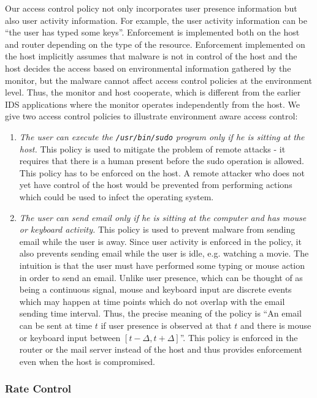 Our access control policy not only incorporates user presence information
but also user activity information.
For example, the user activity information can be 
``the user has typed some keys''.
Enforcement is implemented both on the host and
router depending on the type of the resource. Enforcement implemented on
the host implicitly assumes that malware is not in control of the
host and the host decides the access based on environmental
information gathered by the monitor, but the malware cannot affect
access control policies at the environment level.
Thus, the monitor and host cooperate, which is different from the 
earlier IDS applications where the monitor operates independently from the host.
We give two access control policies to illustrate environment aware
access control:

\begin{enumerate}
\item {\em The user can execute the {\tt /usr/bin/sudo} program only if he
is sitting at the host.}
This policy is used to mitigate the problem of remote attacks - it requires
that there is a human present before the sudo operation is allowed.
This policy has to be enforced on the host.
A remote attacker who does not yet have control of the host would
be prevented from performing actions which could be used to infect the
operating system.

\item {\em The user can send email only if he is sitting at the computer
and has mouse or keyboard activity.}
This policy is used to prevent malware from sending email while the user
is away.
Since user activity is enforced in the policy, it also prevents sending
email while the user is idle, e.g. watching a movie.
The intuition is that the user must have performed some typing or
mouse action in order to send an email.
Unlike user presence, which can be thought of as being
a continuous signal, mouse and keyboard input are discrete events which may
happen at time points which do not overlap with the email sending time interval.
Thus, the precise meaning of the policy is
``An email can be sent at time $t$ if user presence is observed at that $t$
and there is mouse or keyboard input between $[t-\Delta, t+\Delta]$''.
This policy is enforced in the router or the mail server instead of
the host and thus provides enforcement even when the host is compromised.
\end{enumerate}

\subsubsection{Rate Control}
\label{sec:app-rate}

